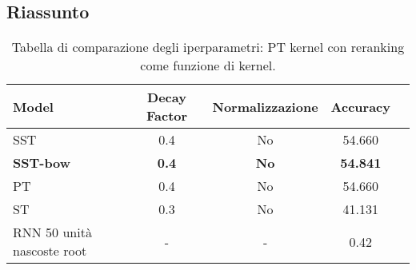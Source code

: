 \subsection{Riassunto}

\begin{table}[H]
    \centering
    \begin{tabular}{l|cccc}
        \toprule
        Model   & Decay Factor  & Normalizzazione   & Accuracy          \\ 
        \hline
        SST     & 0.4           & No                & 54.660            \\
        \textbf{SST-bow} & \textbf{0.4} & \textbf{No} & \textbf{54.841} \\
        PT      & 0.4           & No                & 54.660            \\
        ST      & 0.3           & No                & 41.131            \\
        \hline
        RNN 50 unità nascoste root & - & -          & 0.42              \\
        \bottomrule
    \end{tabular}
    \caption{Tabella di comparazione degli iperparametri: PT kernel con
    reranking come funzione di kernel.}
\end{table}
